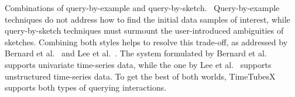 \textsf{Combinations of query-by-example and query-by-sketch.\ }
Query-by-example techniques do not address how to find the initial data samples of interest, 
while query-by-sketch techniques must surmount the user-introduced ambiguities of sketches.
Combining both styles helps to resolve this trade-off, as addressed by 
Bernard et al.~\cite{Bernard2010} and Lee et al.~\cite{Lee2019}. 
The system formulated by Bernard et al.~\cite{Bernard2010} supports univariate time-series data, while the one by Lee et al.~\cite{Lee2019} supports unstructured time-series data.
To get the best of both worlds, TimeTubesX supports both types of querying interactions.